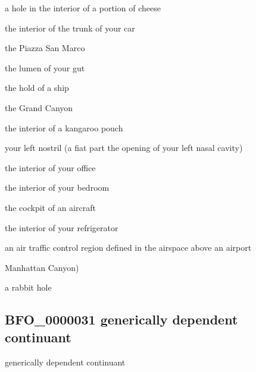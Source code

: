 \documentclass[letterpaper,10pt,english]{sphinxmanual}
\begin{document}
\begin{sphinxShadowBox}

\sphinxAtStartPar
a hole in the interior of a portion of cheese

\sphinxAtStartPar
the interior of the trunk of your car

\sphinxAtStartPar
the Piazza San Marco

\sphinxAtStartPar
the lumen of your gut

\sphinxAtStartPar
the hold of a ship

\sphinxAtStartPar
the Grand Canyon

\sphinxAtStartPar
the interior of a kangaroo pouch

\sphinxAtStartPar
your left nostril (a fiat part \textendash{} the opening \textendash{} of your left nasal cavity)

\sphinxAtStartPar
the interior of your office

\sphinxAtStartPar
the interior of your bedroom

\sphinxAtStartPar
the cockpit of an aircraft

\sphinxAtStartPar
the interior of your refrigerator

\sphinxAtStartPar
an air traffic control region defined in the airspace above an airport

\sphinxAtStartPar
Manhattan Canyon)

\sphinxAtStartPar
a rabbit hole
\end{sphinxShadowBox}

\begin{sphinxShadowBox}

\sphinxAtStartPar
{}
\end{sphinxShadowBox}
\begin{quote}

\ignorespaces \end{quote}


\subsection{BFO\_0000031 \sphinxhyphen{} generically dependent continuant}
\label{\detokenize{doc-BFO_0000031:bfo-0000031-generically-dependent-continuant}}\label{\detokenize{doc-BFO_0000031:index-0}}\label{\detokenize{doc-BFO_0000031::doc}}
\begin{sphinxShadowBox}

\sphinxAtStartPar
generically dependent continuant
\end{sphinxShadowBox}
\end{document}
